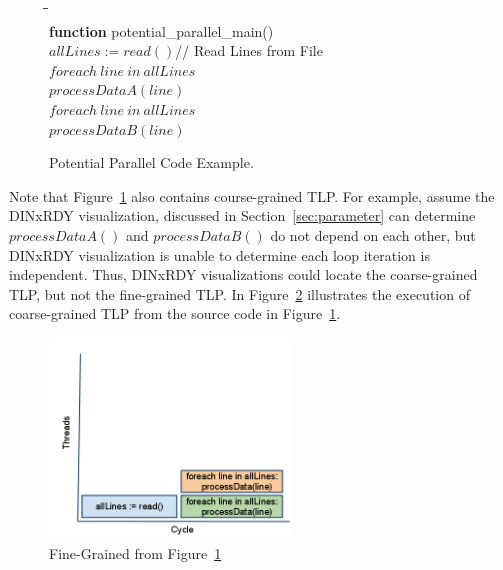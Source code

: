 \documentclass[defaultstyle,11pt]{thesis}
\begin{document}
\begin{figure}
\begin{center}
\begin{minipage}{1.5in}
\begin{tabbing}
\hspace{1em}\=\hspace{1em}\=\hspace{1em}\=\hspace{1em}\=\\
\textbf{function} potential\_parallel\_main()\\
\>$allLines := read()$// Read Lines from File\\
\>$foreach\ line\ in\ allLines$\\
\>\>$processDataA(line)$\\
\>$foreach\ line\ in\ allLines$\\
\>\>$processDataB(line)$
\end{tabbing}
\end{minipage}
\end{center}
\caption{Potential Parallel Code Example.}
\label{fig:parallelsrc}
\end{figure}

Note that Figure~\ref{fig:parallelsrc} also contains course-grained
TLP.  For example, assume the DINxRDY visualization, discussed in
Section~\ref{sec:parameter} can determine $processDataA()$ and
$processDataB()$ do not depend on each other, but DINxRDY
visualization is unable to determine each loop iteration is
independent.  Thus, DINxRDY visualizations could locate the
coarse-grained TLP, but not the fine-grained TLP.  In
Figure~\ref{fig:illistCoarseGrained} illustrates the execution of
coarse-grained TLP from the source code in
Figure~\ref{fig:parallelsrc}.

\begin{figure}
  \centering
 \includegraphics[height=2.10in]{images/coarse_grained_tlp}
  \caption{Fine-Grained from Figure~\ref{fig:parallelsrc}}
  \label{fig:illistCoarseGrained}
\end{figure}
\end{document}
